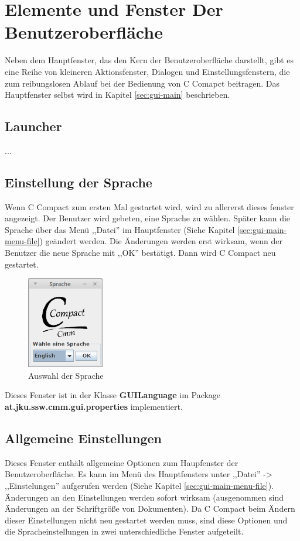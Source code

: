\section{Elemente und Fenster Der Benutzeroberfläche}
Neben dem Hauptfenster, das den Kern der Benutzeroberfläche darstellt, gibt es eine Reihe von kleineren Aktionsfenster, Dialogen und Einstellungsfenstern, die zum reibungslosen Ablauf bei der Bedienung von C Comapct beitragen. Das Hauptfenster selbst wird in Kapitel \ref{sec:gui-main} beschrieben.

\subsection{Launcher}
\label{sec:win-launcher}
...

\subsection{Einstellung der Sprache}
\label{sec:win-lang}
Wenn C Compact zum ersten Mal gestartet wird, wird zu allererst dieses fenster angezeigt. Der Benutzer wird gebeten, eine Sprache zu wählen. Später kann die Sprache über das Menü ,,Datei'' im Hauptfenster (Siehe Kapitel \ref{sec:gui-main-menu-file}) geändert werden. Die Änderungen werden erst wirksam, wenn der Benutzer die neue Sprache mit ,,OK'' bestätigt. Dann wird C Compact neu gestartet.

\begin{figure}[htp]
\centering
\includegraphics[width=0.3\textwidth]{./media/images/gui/elements/Bildschirmfoto-Sprache.png}
\caption{Auswahl der Sprache}
\label{fig:win-lang}
\end{figure}

Dieses Fenster ist in der Klasse \textbf{GUILanguage} im Package \textbf{at.jku.ssw.cmm.gui.properties} implementiert. 

\subsection{Allgemeine Einstellungen}
\label{sec:win-set}
Dieses Fenster enthält allgemeine Optionen zum Haupfenster der Benutzeroberfläche. Es kann im Menü des Hauptfensters unter ,,Datei'' -> ,,Einstelungen'' aufgerufen werden (Siehe Kapitel \ref{sec:gui-main-menu-file}). Änderungen an den Einstellungen werden sofort wirksam (ausgenommen sind Änderungen an der Schriftgröße von Dokumenten). Da C Compact beim Ändern dieser Einstellungen nicht neu gestartet werden muss, sind diese Optionen und die Spracheinstellungen in zwei unterschiedliche Fenster aufgeteilt.

